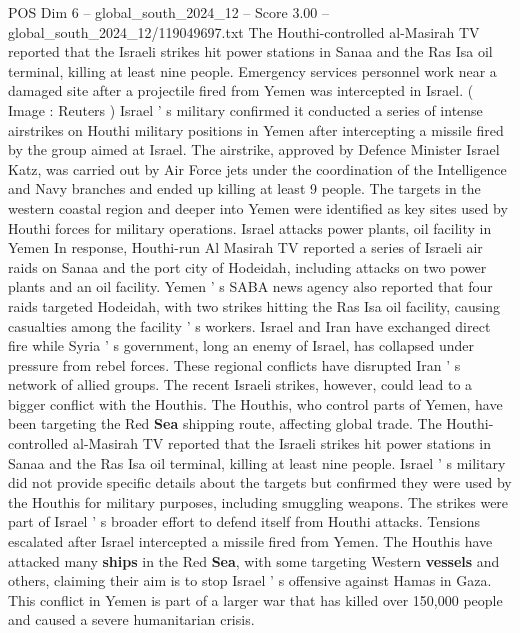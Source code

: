 \begin{textsample}{POS Dim 6 – global\_south\_2024\_12 – Score 3.00 – global\_south\_2024\_12/119049697.txt}  \label{ex:f6_pos_431}
The Houthi-controlled al-Masirah TV reported that the Israeli strikes hit power stations in Sanaa and the Ras Isa oil terminal, killing at least nine people.
Emergency services personnel work near a damaged site after a projectile fired from Yemen was intercepted in Israel. ( Image : Reuters ) Israel ' s military confirmed it conducted a series of intense airstrikes on Houthi military positions in Yemen after intercepting a missile fired by the group aimed at Israel.
The airstrike, approved by Defence Minister Israel Katz, was carried out by Air Force jets under the coordination of the Intelligence and Navy branches and ended up killing at least 9 people.
The targets in the western coastal region and deeper into Yemen were identified as key sites used by Houthi forces for military operations.
Israel attacks power plants, oil facility in Yemen In response, Houthi-run Al Masirah TV reported a series of Israeli air raids on Sanaa and the port city of Hodeidah, including attacks on two power plants and an oil facility.
Yemen ' s SABA news agency also reported that four raids targeted Hodeidah, with two strikes hitting the Ras Isa oil facility, causing casualties among the facility ' s workers.
Israel and Iran have exchanged direct fire while Syria ' s government, long an enemy of Israel, has collapsed under pressure from rebel forces.
These regional conflicts have disrupted Iran ' s network of allied groups.
The recent Israeli strikes, however, could lead to a bigger conflict with the Houthis.
The Houthis, who control parts of Yemen, have been targeting the Red \textbf{Sea} shipping route, affecting global trade.
The Houthi-controlled al-Masirah TV reported that the Israeli strikes hit power stations in Sanaa and the Ras Isa oil terminal, killing at least nine people.
Israel ' s military did not provide specific details about the targets but confirmed they were used by the Houthis for military purposes, including smuggling weapons.
The strikes were part of Israel ' s broader effort to defend itself from Houthi attacks.
Tensions escalated after Israel intercepted a missile fired from Yemen.
The Houthis have attacked many \textbf{ships} in the Red \textbf{Sea}, with some targeting Western \textbf{vessels} and others, claiming their aim is to stop Israel ' s offensive against Hamas in Gaza.
This conflict in Yemen is part of a larger war that has killed over 150,000 people and caused a severe humanitarian crisis.

\end{textsample}

